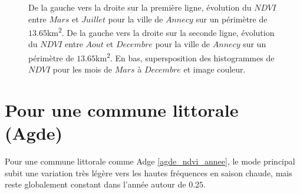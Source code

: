 \documentclass{book}
\begin{document}
\begin{figure}[H]
\begin{center}
\end{center}
\caption{De la gauche vers la droite sur la première ligne, évolution du $NDVI$ entre $Mars$ et $Juillet$ pour la ville de $Annecy$ sur un périmètre de $13.65$km\textsuperscript{2}.
De la gauche vers la droite sur la seconde ligne, évolution du $NDVI$ entre $Aout$ et $Decembre$ pour la ville de $Annecy$ sur un périmètre de $13.65$km\textsuperscript{2}. 
En bas, supersposition des histogrammes de $NDVI$ pour les mois de $Mars$ à $Decembre$ et image couleur.}
\label{annecy_ndvi_annee}
\end{figure}

\clearpage

\section{Pour une commune littorale (Agde)}

Pour une commune littorale comme Adge \ref{agde_ndvi_annee}, le mode principal subit une variation très légère vers les hautes fréquences en saison chaude, mais reste globalement constant dans l'année
autour de $0.25$.
\end{document}
